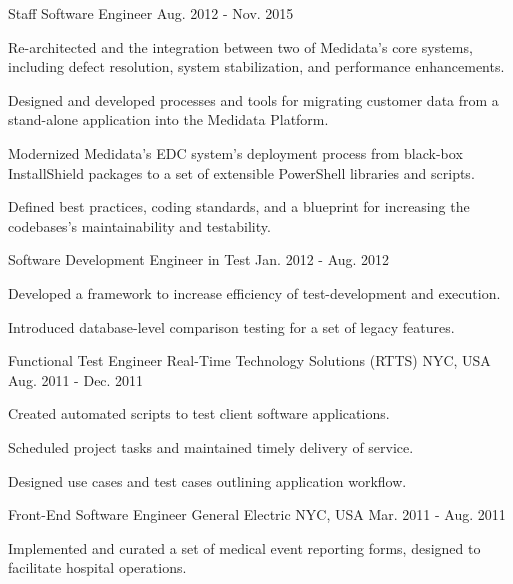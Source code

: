 \begin{cventries}
  \cventry
    {Staff Software Engineer}
    {}
    {}
    {Aug. 2012 - Nov. 2015}
    {
        \begin{cvitems}
          \item {Re-architected and the integration between two of Medidata's core systems, including defect resolution, system stabilization, and performance enhancements.}
          \item {Designed and developed processes and tools for migrating customer data from a stand-alone application into the Medidata Platform.}
          \item {Modernized Medidata's EDC system's deployment process from black-box InstallShield packages to a set of extensible PowerShell libraries and scripts.}
          \item {Defined best practices, coding standards, and a blueprint for increasing the codebases's maintainability and testability.}
        \end{cvitems}
    }
    
  \cventry
    {Software Development Engineer in Test}
    {}
    {}
    {Jan. 2012 - Aug. 2012}
    {
        \begin{cvitems}
          \item {Developed a framework to increase efficiency of test-development and execution.}
          \item {Introduced database-level comparison testing for a set of legacy features.}
        \end{cvitems}
    }
    
  \cventry
    {Functional Test Engineer} %
    {Real-Time Technology Solutions (RTTS)} %
    {NYC, USA} %
    {Aug. 2011 - Dec. 2011} %
    {
      \begin{cvitems} %
        \item {Created automated scripts to test client software applications.}
        \item {Scheduled project tasks and maintained timely delivery of service.}
        \item {Designed use cases and test cases outlining application workflow.}
      \end{cvitems}
    }

  \cventry
    {Front-End Software Engineer} %
    {General Electric} %
    {NYC, USA} %
    {Mar. 2011 - Aug. 2011} %
    {
      \begin{cvitems} %
        \item {Implemented and curated a set of medical event reporting forms, designed to facilitate hospital operations.}
      \end{cvitems}
    }

\end{cventries}
